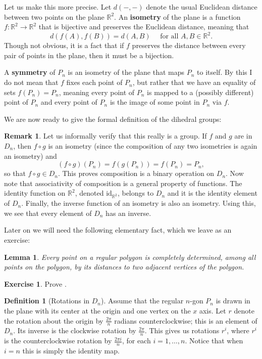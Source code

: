 \documentclass[12pt]{report}
\newtheorem{lemma}[theorem]{Lemma}
\numberwithin{equation}{section}
\numberwithin{theorem}{chapter}
\theoremstyle{definition}
\newtheorem{definition}[theorem]{Definition}
\newtheorem{exercise}{Exercise}
\newtheorem*{basic properties}{Basic Properties}
\newtheorem*{Important Remark}{Important Remark}
\newtheorem{remark}[theorem]{Remark}
\newcommand{\df}[1]{{\bf #1}\index{#1}}
\begin{document}
Let us make this more precise. Let $d(-,-)$ denote the usual Euclidean distance between two points on the plane $\mathbb{R}^2$. An \df{isometry} of the plane is a function $f\!: \mathbb{R}^2 \to \mathbb{R}^2$ that is bijective and preserves the Euclidean distance, meaning that
$$d(f(A),f(B))=d(A,B) \quad \textrm{ for all } A,B \in \mathbb{R}^2.$$
Though not obvious, it is a fact that if $f$ preserves the distance between every pair of points in the plane, then it must be a bijection. 

A \df{symmetry} of $P_n$ is an isometry of the plane that maps $P_n$ to itself. By this I do not mean that $f$ fixes each point of $P_n$, but rather that we have an equality of sets $f(P_n) = P_n$, meaning every point of $P_n$ is mapped to a (possibly different) point of $P_n$ and every point of $P_n$ is the image of some point in $P_n$ via $f$.

We are now ready to give the formal definition of the dihedral groups:



\begin{remark}
Let us informally verify that this really is a group.
If $f$ and $g$ are in $D_n$, then $f \circ g$ is an isometry (since the composition of any two isometries is again an isometry) and 
$$(f \circ g)(P_n) = f(g(P_n)) = f(P_n) = P_n,$$ 
so that $f \circ g \in D_n$. This proves composition is a binary operation on $D_n$. 
Now note that associativity of composition is a general property of functions.
The identity function on $\mathbb{R}^2$, denoted $\mathrm{id}_{\mathbb{R}^2}$, belongs to $D_n$ and it is the identity element of $D_n$.
Finally, the inverse function of an isometry is also an isometry. Using this, we see that every element of $D_n$ has an inverse.
\end{remark}


Later on we will need the following elementary fact, which we leave as an exercise:

\begin{lemma}\label{lemma polygon}
	Every point on a regular polygon is completely determined, among all points on the polygon, by its distances to two adjacent vertices of the polygon.
\end{lemma}


\begin{exercise}
	Prove .
\end{exercise}


\begin{definition}[Rotations in $D_n$]
	Assume that the regular $n$-gon $P_n$ is drawn in the plane with its center at the origin and one vertex on the $x$ axis. Let $r$ denote the rotation about the origin by $\frac{2\pi}{n}$ radians counterclockwise; this is an element of $D_n$. Its inverse is the clockwise rotation by $\frac{2 \pi}{n}$. This gives us rotations $r^i$, where $r^i$ is the counterclockwise rotation by $\frac{2 \pi i}{n}$, for each $i = 1, \ldots, n$. Notice that when $i=n$ this is simply the identity map.
\end{definition}
\end{document}

